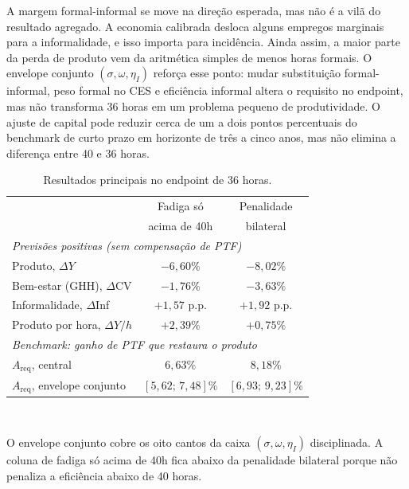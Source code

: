 \documentclass[10pt,twocolumn]{article}
\begin{document}
A margem formal-informal se move na dire\c{c}\~ao esperada, mas n\~ao \'e a vil\~a do resultado agregado. A economia calibrada desloca alguns empregos marginais para a informalidade, e isso importa para incid\^encia. Ainda assim, a maior parte da perda de produto vem da aritm\'etica simples de menos horas formais. O envelope conjunto $(\sigma,\omega,\eta_I)$ refor\c{c}a esse ponto: mudar substitui\c{c}\~ao formal-informal, peso formal no CES e efici\^encia informal altera o requisito no endpoint, mas n\~ao transforma 36 horas em um problema pequeno de produtividade. O ajuste de capital pode reduzir cerca de um a dois pontos percentuais do benchmark de curto prazo em horizonte de tr\^es a cinco anos, mas n\~ao elimina a diferen\c{c}a entre 40 e 36 horas.

\begin{table}[t]
\centering
\caption{Resultados principais no endpoint de 36 horas.}\label{tab:main_results}
\small
\begin{tabular}{@{}l c c@{}}
\hline\hline
 & Fadiga s\'o & Penalidade \\
 & acima de 40h & bilateral \\
\hline
\multicolumn{3}{l}{\textit{Previs\~oes positivas (sem compensa\c{c}\~ao de PTF)}} \\
Produto, $\Delta Y$                       & $-6{,}60\%$       & $-8{,}02\%$ \\
Bem-estar (GHH), $\Delta$CV               & $-1{,}76\%$       & $-3{,}63\%$ \\
Informalidade, $\Delta$Inf                & $+1{,}57$ p.p.    & $+1{,}92$ p.p. \\
Produto por hora, $\Delta Y/h$            & $+2{,}39\%$       & $+0{,}75\%$ \\
\hline
\multicolumn{3}{l}{\textit{Benchmark: ganho de PTF que restaura o produto}} \\
$A_{\text{req}}$, central                 & $6{,}63\%$        & $8{,}18\%$ \\
$A_{\text{req}}$, envelope conjunto       & $[5{,}62;\,7{,}48]\%$ & $[6{,}93;\,9{,}23]\%$ \\
\hline\hline
\end{tabular}
\\[2pt]
\begin{minipage}{0.95\textwidth}
\justifying
{\footnotesize O envelope conjunto cobre os oito cantos da caixa $(\sigma,\omega,\eta_I)$ disciplinada. A coluna de fadiga s\'o acima de 40h fica abaixo da penalidade bilateral porque n\~ao penaliza a efici\^encia abaixo de 40 horas.}
\end{minipage}
\end{table}
\end{document}
